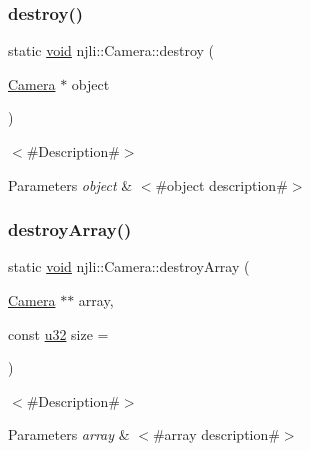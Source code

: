 \mbox{\label{classnjli_1_1_camera_a0bb5889b740a1e9834ba49d35cab6ec4}} 
\subsubsection{\texorpdfstring{destroy()}{destroy()}}
{\footnotesize\ttfamily static \mbox{\hyperlink{_thread_8h_af1e856da2e658414cb2456cb6f7ebc66}{void}} njli\+::\+Camera\+::destroy (\begin{DoxyParamCaption}\item[{\mbox{\hyperlink{classnjli_1_1_camera}{Camera}} $\ast$}]{object }\end{DoxyParamCaption})\hspace{0.3cm}{\ttfamily [static]}}

$<$\#\+Description\#$>$


\begin{DoxyParams}{Parameters}
{\em object} & $<$\#object description\#$>$ \\
\hline
\end{DoxyParams}
\mbox{\label{classnjli_1_1_camera_a168d7d1a1c93c674c03a16bd2ef9743e}} 
\subsubsection{\texorpdfstring{destroy\+Array()}{destroyArray()}}
{\footnotesize\ttfamily static \mbox{\hyperlink{_thread_8h_af1e856da2e658414cb2456cb6f7ebc66}{void}} njli\+::\+Camera\+::destroy\+Array (\begin{DoxyParamCaption}\item[{\mbox{\hyperlink{classnjli_1_1_camera}{Camera}} $\ast$$\ast$}]{array,  }\item[{const \mbox{\hyperlink{_util_8h_a10e94b422ef0c20dcdec20d31a1f5049}{u32}}}]{size = {} }\end{DoxyParamCaption})\hspace{0.3cm}{\ttfamily [static]}}

$<$\#\+Description\#$>$


\begin{DoxyParams}{Parameters}
{\em array} & $<$\#array description\#$>$ \\
\hline
\end{DoxyParams}
\mbox{\label{classnjli_1_1_camera_a0421efa372890d9e3a934911a4aeebf1}} 
